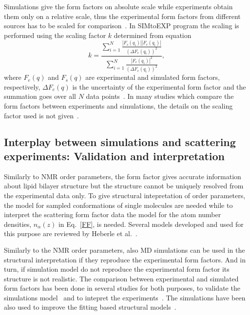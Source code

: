 \documentclass[aps,prl,superscriptaddress,twocolumn]{revtex4}
\begin{document}
Simulations give the form factors on absolute scale while experiments obtain them only on a relative scale,
thus the experimental form factors from different sources has to be scaled for comparison~\cite{kucerka08a,kucerka10}.
In SIMtoEXP program the scaling is performed using the scaling factor $k$ determined from equation
\begin{equation}
k=\frac{\sum_{i=1}^N\frac{|F_s(q_i)||F_e(q_i)|}{(\Delta F_e(q_i))^2}}{\sum_{i=1}^N\frac{|F_e(q_i)|^2}{(\Delta F_e(q_i))^2}},
\end{equation} 
where $F_e(q)$ and $F_s(q)$ are experimental and simulated form factors, respectively, $\Delta F_e(q)$ is the uncertainty
of the experimental form factor and the summation goes over all $N$ data points~\cite{kucerka08a,kucerka10}.
In many studies which compare the form factors between experiments and simulations, the details on the scaling
factor used is not given~\cite{??}. 

\onecolumngrid
{}
\twocolumngrid

\subsection{Interplay between simulations and scattering experiments: Validation and interpretation}
Similarly to NMR order parameters, the form factor gives accurate information about lipid
bilayer structure but the structure cannot be uniquely resolved from the experimental data only.
To give structural intepretation of order parameters, the model for sampled conformations of 
single molecules are needed while to interpret the scattering form factor data the model
for the atom number densities, $n_\alpha(z)$ in Eq.~\ref{FF}, is needed.
Several models developed and used for this purpose are reviewed by Heberle et al.~\cite{heberle12}.

Similarly to the NMR order parameters, also MD simulations can be used in the structural
interpretation if they reproduce the experimental form factors. And in turn,
if simulation model do not reproduce the experimental form factor its structure is not 
realistic. The comparison between experimental and simulated form factors has been done 
in several studies for both purposes, to validate the simulations 
model~\cite{hogberg08,chiu09,klauda10,dickson12,jambeck12,lim12,klauda12,jambeck13,chowdhary13,lee14,maciejewski14,dickson14,tjornhammar14,madej15,kulig15b} and to intepret the experiments~\cite{sachs03,klauda06,kucerka08a,kucerka08b,braun13}. 
The simulations have been also used to improve the fitting based structural models~\cite{??}.
\end{document}
